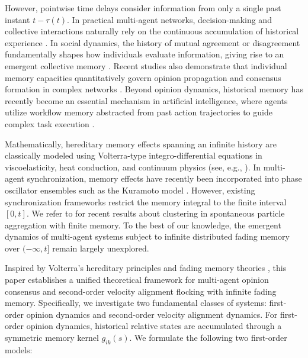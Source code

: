 \documentclass[11pt]{amsart}
\numberwithin{equation}{section}
\begin{document}
However, pointwise time delays consider information from only a single past instant $t - \tau(t)$. In practical multi-agent networks, decision-making and collective interactions naturally rely on the continuous accumulation of historical experience \cite{Jiang2025, Liu2023}. In social dynamics, the history of mutual agreement or disagreement fundamentally shapes how individuals evaluate information, giving rise to an emergent collective memory \cite{Boschi2021}. Recent studies also demonstrate that individual memory capacities quantitatively govern opinion propagation and consensus formation in complex networks \cite{Liu2026}. Beyond opinion dynamics, historical memory has recently become an essential mechanism in artificial intelligence, where agents utilize workflow memory abstracted from past action trajectories to guide complex task execution \cite{wang2025agent}.

Mathematically, hereditary memory effects spanning an infinite history are classically modeled using Volterra-type integro-differential equations in viscoelasticity, heat conduction, and continuum physics (see, e.g., \cite{Chepyzhov2006, Conti2020, Dafermos1970, Giorgi2001}). In multi-agent synchronization, memory effects have recently been incorporated into phase oscillator ensembles such as the Kuramoto model \cite{Cho2025}. However, existing synchronization frameworks restrict the memory integral to the finite interval $[0, t].$ We refer to \cite{Hask_memory} for recent results about clustering in spontaneous particle aggregation with finite memory. To the best of our knowledge, the emergent dynamics of multi-agent systems subject to infinite distributed fading memory over $(-\infty, t]$ remain largely unexplored.

Inspired by Volterra's hereditary principles \cite{Volterra1930} and fading memory theories \cite{Conti2020, Dafermos1970, Giorgi2001}, this paper establishes a unified theoretical framework for multi-agent opinion consensus and second-order velocity alignment flocking with infinite fading memory. Specifically, we investigate two fundamental classes of systems: first-order opinion dynamics and second-order velocity alignment dynamics. For first-order opinion dynamics, historical relative states are accumulated through a symmetric memory kernel $g_{ik}(s)$. We formulate the following two first-order models:
\vspace{0.2cm}
\end{document}
